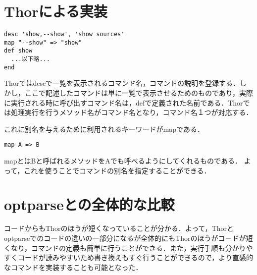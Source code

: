 \documentclass[a4j,twocolumn]{jsarticle}
\begin{document}
\section{Thorによる実装}
\begin{verbatim}
desc 'show,--show', 'show sources'
map "--show" => "show"
def show
  ...以下略...
end
\end{verbatim}
Thorではdescで一覧を表示されるコマンド名，コマンドの説明を登録する．しかし，ここで記述したコマンドは単に一覧で表示させるためのものであり，実際に実行される時に呼び出すコマンド名は，defで定義された名前である．Thorでは処理実行を行うメソッド名がコマンド名となり，コマンド名１つが対応する．

これに別名を与えるために利用されるキーワードがmapである．
\begin{verbatim}
map A => B
\end{verbatim}
mapとはBと呼ばれるメソッドをAでも呼べるようにしてくれるものである．
よって，これを使うことでコマンドの別名を指定することができる．

\section{optparseとの全体的な比較}
コードからもThorのほうが短くなっていることが分かる．よって，Thorとoptparseでのコードの違いの一部分になるが全体的にもThorのほうがコードが短くなり，コマンドの定義も簡単に行うことができる．また，実行手順も分かりやすくコードが読みやすいため書き換えもすぐ行うことができるので，より直感的なコマンドを実装することも可能となった．
\end{document}
